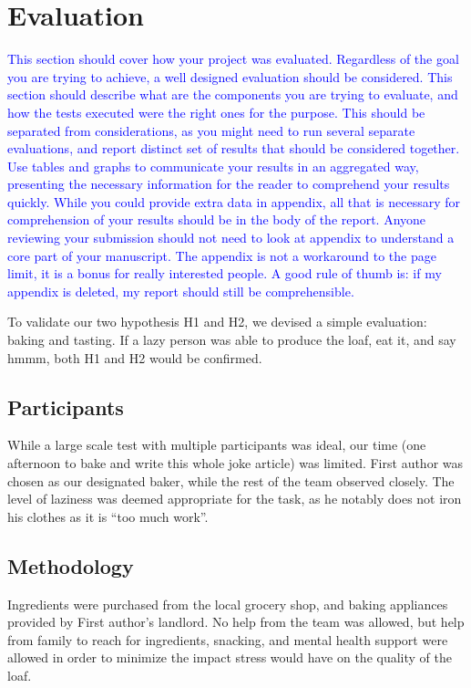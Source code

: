 \documentclass[acmtog, nonacm]{acmart}
\begin{document}
\section{Evaluation}
\textcolor{blue}{This section should cover how your project was evaluated. 
Regardless of the goal you are trying to achieve, a well designed evaluation should be considered. 
This section should describe what are the components you are trying to evaluate, and how the tests executed were the right ones for the purpose. 
This should be separated from considerations, as you might need to run several separate evaluations, and report distinct set of results that should be considered together. 
Use tables and graphs to communicate your results in an aggregated way, presenting the necessary information for the reader to comprehend your results quickly. 
While you could provide extra data in appendix, all that is necessary for comprehension of your results should be in the body of the report. 
Anyone reviewing your submission should not need to look at appendix to understand a core part of your manuscript. 
The appendix is not a workaround to the page limit, it is a bonus for really interested people. 
A good rule of thumb is: if my appendix is deleted, my report should still be comprehensible. 
}

To validate our two hypothesis H1 and H2, we devised a simple evaluation: baking and tasting. 
If a lazy person was able to produce the loaf, eat it, and say hmmm, both H1 and H2 would be confirmed. 

\subsection{Participants}
While a large scale test with multiple participants was ideal, our time (one afternoon to bake and write this whole joke article) was limited. 
First author was chosen as our designated baker, while the rest of the team observed closely. 
The level of laziness was deemed appropriate for the task, as he notably does not iron his clothes as it is ``too much work''.

\subsection{Methodology}
Ingredients were purchased from the local grocery shop, and baking appliances provided by First author's landlord. 
No help from the team was allowed, but help from family to reach for ingredients, snacking, and mental health support were allowed in order to minimize the impact stress would have on the quality of the loaf. 
\end{document}
